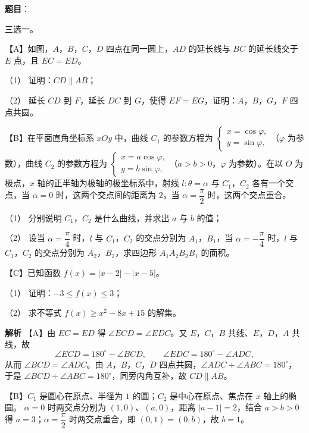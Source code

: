 \begin{answer}

\textbf{题目}：

三选一。

【A】如图，$A$，$B$，$C$，$D$ 四点在同一圆上，$AD$ 的延长线与 $BC$ 的延长线交于 $E$ 点，且 $EC=ED$。

（1） 证明：$CD\parallel AB$；

（2） 延长 $CD$ 到 $F$，延长 $DC$ 到 $G$，使得 $EF=EG$，证明：$A$，$B$，$G$，$F$ 四点共圆。
\nopagebreak[4]
\begin{center}\end{center}
\nopagebreak[4]
【B】在平面直角坐标系 $xOy$ 中，曲线 $C_1$ 的参数方程为 $\begin{cases}x=\cos\varphi,\\y=\sin\varphi,\end{cases}$（$\varphi$ 为参数），曲线 $C_2$ 的参数方程为 $\begin{cases}x=a\cos\varphi,\\y=b\sin\varphi,\end{cases}$（$a>b>0$，$\varphi$ 为参数）。在以 $O$ 为极点，$x$ 轴的正半轴为极轴的极坐标系中，射线 $l:\theta=\alpha$ 与 $C_1$，$C_2$ 各有一个交点，当 $\alpha=0$ 时，这两个交点间的距离为 $2$，当 $\alpha=\dfrac\pi2$ 时，这两个交点重合。

（1） 分别说明 $C_1$，$C_2$ 是什么曲线，并求出 $a$ 与 $b$ 的值；

（2） 设当 $\alpha=\dfrac\pi4$ 时，$l$ 与 $C_1$，$C_2$ 的交点分别为 $A_1$，$B_1$，当 $\alpha=-\dfrac\pi4$ 时，$l$ 与 $C_1$，$C_2$ 的交点分别为 $A_2$，$B_2$，求四边形 $A_1A_2B_2B_1$ 的面积。

【C】已知函数 $f(x)=|x-2|-|x-5|$。

（1） 证明：$-3\leqslant f(x)\leqslant3$；

（2） 求不等式 $f(x)\geqslant x^2-8x+15$ 的解集。

\textbf{解析}
【A】由 $EC=ED$ 得 $\angle ECD=\angle EDC$。又 $E$，$C$，$B$ 共线、$E$，$D$，$A$ 共线，故
\nopagebreak[4]
\[\angle ECD=180^\circ-\angle BCD,\qquad \angle EDC=180^\circ-\angle ADC,\]
从而 $\angle BCD=\angle ADC$。由 $A$，$B$，$C$，$D$ 四点共圆，$\angle ADC+\angle ABC=180^\circ$，于是 $\angle BCD+\angle ABC=180^\circ$，同旁内角互补，故 $CD\parallel AB$。

【B】$C_1$ 是圆心在原点、半径为 $1$ 的圆；$C_2$ 是中心在原点、焦点在 $x$ 轴上的椭圆。
$\alpha=0$ 时两交点分别为 $(1,0)$、$(a,0)$，距离 $|a-1|=2$，结合 $a>b>0$ 得 $a=3$；$\alpha=\dfrac\pi2$ 时两交点重合，即 $(0,1)=(0,b)$，故 $b=1$。


\end{answer}
